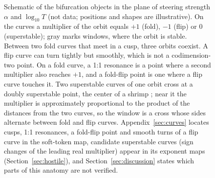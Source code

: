 \begin{figure}[H]
\caption{Schematic of the bifurcation objects in the plane of steering strength $\alpha$ and $\log_{10}T$ (not data;
positions and shapes are illustrative). On the curves a multiplier of the orbit equals $+1$ (fold), $-1$ (flip) or
$0$ (superstable); gray marks windows, where the orbit is stable. Between two fold curves that meet in a cusp, three
orbits coexist. A flip curve can turn tightly but smoothly, which is not a codimension-two point. On a fold curve, a
1:1 resonance is a point where a second multiplier also reaches $+1$, and a fold-flip point is one where a flip curve
touches it. Two superstable curves of one orbit cross at a doubly superstable point, the center of a shrimp
\cite{gallas1993structure,jones2012rossler}; near it the multiplier is approximately proportional to the product of
the distances from the two curves, so the window is a cross whose sides alternate between fold and flip curves.
Appendix~\ref{sec:curves} locates cusps, 1:1 resonances, a fold-flip point and smooth turns of a flip curve in the
soft-token map, candidate superstable curves (sign changes of the leading real multiplier) appear in its exponent maps
(Section~\ref{sec:hostile}), and
Section~\ref{sec:discussion} states which parts of this anatomy are not verified.}
\label{fig:atlas}
\end{figure}
